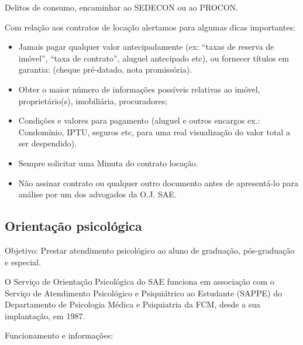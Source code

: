 Delitos de consumo, encaminhar ao SEDECON ou ao PROCON.

Com relação aos contratos de locação alertamos para algumas dicas importantes:

\begin{itemize}
    \item  Jamais pagar qualquer valor antecipadamente (ex: ``taxas de reserva
        de imóvel'', ``taxa de contrato'', aluguel antecipado etc), ou fornecer
        títulos em garantia: (cheque pré-datado, nota promissória).

    \item  Obter o maior número de informações possíveis relativas ao imóvel,
        proprietário(s), imobiliária, procuradores;

    \item  Condições e valores para pagamento (aluguel e outros encargos ex.:
        Condomínio, IPTU, seguros etc, para uma real visualização do valor total
        a ser despendido).

    \item  Sempre solicitar uma Minuta do contrato locação.

    \item  Não assinar contrato ou qualquer outro documento antes de
        apresentá-lo para análise por um dos advogados da O.J. SAE.
\end{itemize}

\subsection{Orientação psicológica}

Objetivo: Prestar atendimento psicológico ao aluno de graduação, pós-graduação e
especial.

O Serviço de Orientação Psicológica do SAE funciona em associação com o Serviço
de Atendimento Psicológico e Psiquiátrico ao Estudante (SAPPE) do Departamento
de Psicologia Médica e Psiquiatria da FCM, desde a sua implantação, em 1987.

Funcionamento e informações:

